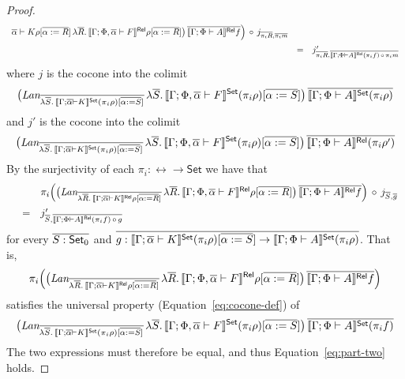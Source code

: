 \documentclass{lmcs}
\theoremstyle{plain}\newtheorem{satz}[thm]{Satz}
\newcommand{\set}{\mathsf{Set}}
\begin{document}
\begin{proof}
\[\begin{array}{lll}
{{{      \overline{\alpha} 
    \vdash K}\rho[\overline{\alpha := R}]}}\,   
    \lambda \overline{R}.\,\llbracket{\Gamma; \Phi, \overline{\alpha} \vdash
      F}\rrbracket^{\mathsf{Rel}}\rho[\overline{\alpha := R}]\big)\, 
    \overline{\llbracket{\Gamma; \Phi \vdash A}\rrbracket^{\mathsf{Rel}}f} \Big)
\,\circ\, j_{\overline{\pi_i R}, \overline{\pi_i m}} \\[2ex]
& = & j'_{\overline{\pi_i R}, \overline{\llbracket{\Gamma; \Phi \vdash A}\rrbracket^{\mathsf{Rel}}(\pi_i f)
    \,\circ\, \pi_i m}} 
\end{array}\]
where $j$ is the cocone into the colimit
\[
\big(\textit{Lan}_{\ol{\lambda \ol{S}.\,\setsem{\Gamma; \ol\alpha
      \vdash K}(\pi_i \rho)[\ol{\alpha := S}]}}\, \lambda
\ol{S}.\,\setsem{\Gamma; \Phi, \ol\alpha \vdash F}(\pi_i
\rho)[\ol{\alpha := S}]\big)\, \ol{\setsem{\Gamma; \Phi \vdash
    A}(\pi_i \rho)}
\]
and $j'$ is the cocone into the colimit
\[
\big(\textit{Lan}_{\ol{\lambda \ol{S}.\,\setsem{\Gamma; \ol\alpha
      \vdash K}(\pi_i \rho)[\ol{\alpha := S}]}}\, \lambda
\ol{S}.\,\setsem{\Gamma; \Phi, \ol\alpha \vdash F}(\pi_i
\rho)[\ol{\alpha := S}]\big)\, \ol{\relsem{\Gamma; \Phi \vdash
    A}(\pi_i \rho')}
\]
By the surjectivity of each $\pi_i : \rel \to \set$ we have that
\[\begin{array}{lll}
 & & \pi_i \Big( \big(\textit{Lan}_{\overline{\lambda
    \overline{R}.\,\llbracket{\Gamma; \overline{\alpha} \vdash K}\rrbracket^{\mathsf{Rel}}\rho[\overline{\alpha :=
        R}]}}\, \lambda \overline{R}.\,\llbracket{\Gamma; \Phi, \overline{\alpha}
  \vdash F}\rrbracket^{\mathsf{Rel}}\rho[\overline{\alpha := R}]\big)\, \overline{\llbracket{\Gamma; \Phi
    \vdash A}\rrbracket^{\mathsf{Rel}}f} \Big) \,\circ\, j_{\overline{S}, \overline{g}} \\[2ex]
& = & j'_{\overline{S}, \overline{\llbracket{\Gamma; \Phi \vdash A}\rrbracket^{\mathsf{Rel}}(\pi_i f) \,\circ\, g}}
\end{array}\]
for every $\ol{S: \set_0}$ and $\ol{g : \setsem{\Gamma; \ol\alpha
    \vdash K}(\pi_i \rho)[\ol{\alpha := S}] \to \setsem{\Gamma; \Phi
    \vdash A}(\pi_i \rho)}$. That is,
\[\pi_i \Big( \big(\textit{Lan}_{\overline{\lambda
    \overline{R}.\,\llbracket{\Gamma; \overline{\alpha} \vdash K}\rrbracket^{\mathsf{Rel}}\rho[\overline{\alpha :=
        R}]}}\, \lambda \overline{R}.\,\llbracket{\Gamma; \Phi, \overline{\alpha}
  \vdash F}\rrbracket^{\mathsf{Rel}}\rho[\overline{\alpha := R}]\big)\, \overline{\llbracket{\Gamma; \Phi
    \vdash A}\rrbracket^{\mathsf{Rel}}f} \Big)\]
satisfies the universal property (Equation~\ref{eq:cocone-def}) of
\[
\big(\textit{Lan}_{\ol{\lambda \ol{S}.\,\setsem{\Gamma; \ol\alpha
      \vdash K} (\pi_i \rho) [\ol{\alpha := S}]}}\, \lambda
\ol{S}.\,\setsem{\Gamma; \Phi, \ol\alpha \vdash F} (\pi_i \rho)
   [\ol{\alpha := S}]\big)\, \ol{\setsem{\Gamma; \Phi \vdash A} (\pi_i
     f)}
\]
The two expressions must therefore be equal, and thus
Equation~\ref{eq:part-two} holds.
\end{proof}
\end{document}
